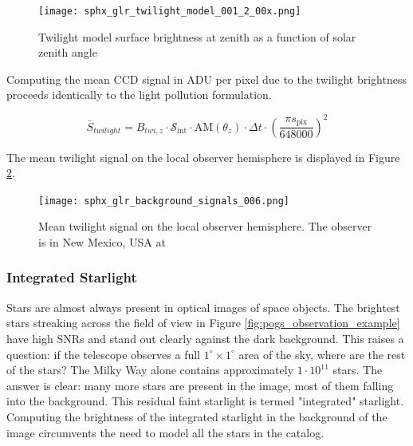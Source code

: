 \begin{figure}[ht]
  \centering
  \texttt{[image: sphx\_glr\_twilight\_model\_001\_2\_00x.png]}
  \caption{Twilight model surface brightness at zenith as a function of solar zenith angle}
  \label{fig:twilight_model}
\end{figure}

Computing the mean CCD signal in ADU per pixel due to the twilight brightness proceeds identically to the light pollution formulation. 

\begin{equation} \label{eq:twilight_adu}
  \bar{S}_{twilight} = B_{twi,z} \cdot \mathcal{S}_\mathrm{int} \cdot \textrm{AM}(\theta_z) \cdot \Delta t \cdot \left( \frac{\pi s_\mathrm{pix}}{648000} \right)^2
\end{equation}

The mean twilight signal on the local observer hemisphere is displayed in Figure \ref{fig:twilight_hemi}.

\begin{figure}[ht]
  \centering
  \texttt{[image: sphx\_glr\_background\_signals\_006.png]}
  \caption{Mean twilight signal on the local observer hemisphere. The observer is in New Mexico, USA at
  \pogslla}
  \label{fig:twilight_hemi}
\end{figure}

\subsubsection{Integrated Starlight}

Stars are almost always present in optical images of space objects. The brightest stars streaking across the field of view in Figure \ref{fig:pogs_observation_example} have high SNRs and stand out clearly against the dark background. This raises a question: if the telescope observes a full $1^\circ \times 1^\circ$ area of the sky, where are the rest of the stars? The Milky Way alone contains approximately $1\cdot10^{11}$ stars. The answer is clear: many more stars are present in the image, most of them falling into the background. This residual faint starlight is termed "integrated" starlight. Computing the brightness of the integrated starlight in the background of the image circumvents the need to model all the stars in the catalog.

